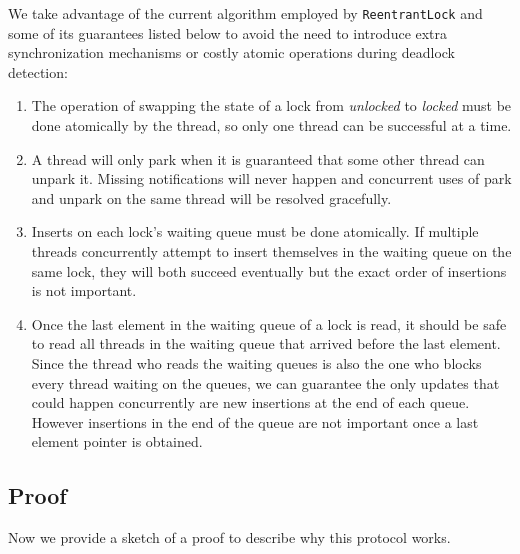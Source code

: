 We take advantage of the current algorithm employed by {\tt ReentrantLock} and some of its guarantees listed below to avoid the need to introduce extra synchronization mechanisms or costly atomic operations during deadlock detection:
\begin{enumerate}
\item The operation of swapping the state of a lock from \emph{unlocked} to \emph{locked} must be done atomically by the thread, so only one thread can be successful at a time.
\item A thread will only park when it is guaranteed that some other thread can unpark it. Missing notifications will never happen and concurrent uses of park and unpark on the same thread will be resolved gracefully.
\item Inserts on each lock's waiting queue must be done atomically. If multiple threads concurrently attempt to insert themselves in the waiting queue on the same lock, they will both succeed eventually but the exact order of insertions is not important.
\item Once the last element in the waiting queue of a lock is read, it should be safe to read all threads in the waiting queue that arrived before the last element. Since the thread who reads the waiting queues is also the one who blocks every thread waiting on the queues, we can guarantee the only updates that could happen concurrently are new insertions at the end of each queue. However insertions in the end of the queue are not important once a last element pointer is obtained.
\end{enumerate}

\subsection{Proof}

Now we provide a sketch of a proof to describe why this protocol works.

